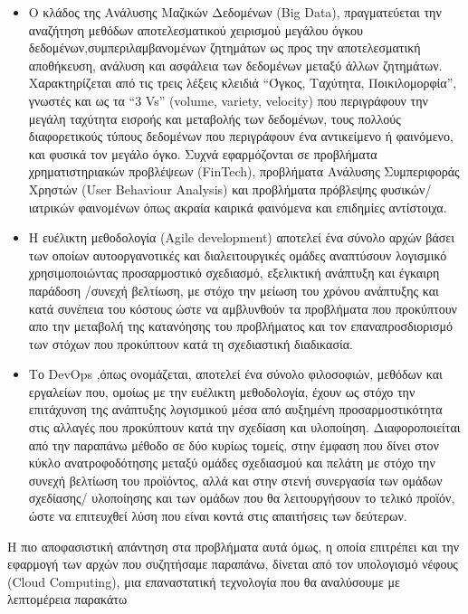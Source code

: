 \documentclass{article}
\begin{document}
\begin{itemize}
\item Ο κλάδος της Ανάλυσης Μαζικών Δεδομένων (Big Data), πραγματεύεται την αναζήτηση μεθόδων αποτελεσματικού χειρισμού μεγάλου όγκου δεδομένων,συμπεριλαμβανομένων ζητημάτων ως προς την αποτελεσματική αποθήκευση, ανάλυση και ασφάλεια των δεδομένων μεταξύ άλλων ζητημάτων. Χαρακτηρίζεται από τις τρεις λέξεις κλειδιά “Όγκος, Ταχύτητα, Ποικιλομορφία”, γνωστές και ως τα “3 Vs” (volume, variety, velocity) που περιγράφουν την μεγάλη ταχύτητα εισροής και μεταβολής των δεδομένων, τους πολλούς διαφορετικούς τύπους δεδομένων που περιγράφουν ένα αντικείμενο ή φαινόμενο, και φυσικά τον μεγάλο όγκο. Συχνά εφαρμόζονται σε προβλήματα χρηματιστηριακών προβλέψεων (FinTech), προβλήματα Ανάλυσης Συμπεριφοράς Χρηστών (User Behaviour Analysis) και προβλήματα πρόβλεψης φυσικών/ιατρικών φαινομένων όπως ακραία καιρικά φαινόμενα και επιδημίες αντίστοιχα.
\item Η ευέλικτη μεθοδολογία (Agile development) αποτελεί ένα σύνολο αρχών βάσει των οποίων αυτοοργανοτικές και διαλειτουργικές ομάδες αναπτύσουν λογισμικό χρησιμοποιώντας προσαρμοστικό σχεδιασμό, εξελικτική ανάπτυξη και  έγκαιρη παράδοση /συνεχή βελτίωση, με στόχο την μείωση του χρόνου ανάπτυξης και κατά συνέπεια του κόστους ώστε να αμβλυνθούν τα προβλήματα που προκύπτουν απο την μεταβολή της κατανόησης του προβλήματος και τον επαναπροσδιορισμό των στόχων που προκύπτουν κατά τη σχεδιαστική διαδικασία.
\item Το DevOps ,όπως ονομάζεται, αποτελεί ένα σύνολο φιλοσοφιών, μεθόδων και εργαλείων που, ομοίως με την ευέλικτη μεθοδολογία, έχουν ως στόχο την επιτάχυνση της ανάπτυξης λογισμικού μέσα από αυξημένη προσαρμοστικότητα στις αλλαγές που προκύπτουν κατά την σχεδίαση και υλοποίηση. Διαφοροποιείται από την παραπάνω μέθοδο σε δύο κυρίως τομείς, στην έμφαση που δίνει στον κύκλο ανατροφοδότησης μεταξύ ομάδες σχεδιασμού και πελάτη με στόχο την συνεχή βελτίωση του προϊόντος, αλλά και στην στενή συνεργασία των ομάδων σχεδίασης/ υλοποίησης και των ομάδων που θα λειτουργήσουν το τελικό προϊόν, ώστε να επιτευχθεί λύση που είναι κοντά στις απαιτήσεις των δεύτερων.
\end{itemize}
Η πιο αποφασιστική απάντηση στα προβλήματα αυτά όμως, η οποία επιτρέπει και την εφαρμογή των αρχών που συζητήσαμε παραπάνω, δίνεται από τον υπολογισμό νέφους (Cloud Computing), μια επαναστατική τεχνολογία που θα αναλύσουμε με λεπτομέρεια παρακάτω
\end{document}
